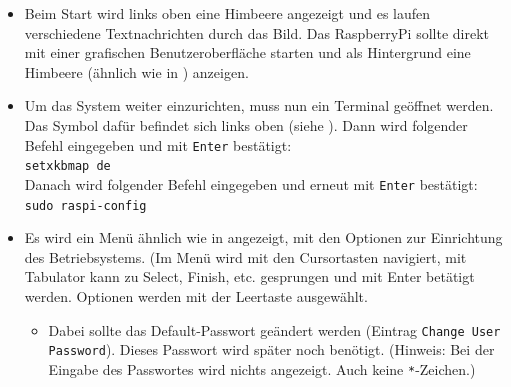 \begin{itemize}
{		Als letztes wird die Stromversorgung angeschlossen und das RaspberryPi startet automatisch.
		}
	\item {Beim Start wird links oben eine Himbeere angezeigt und es laufen verschiedene Textnachrichten durch das Bild. 
		Das RaspberryPi sollte direkt mit einer grafischen Benutzeroberfläche starten und als Hintergrund eine Himbeere (ähnlich wie in ) anzeigen.
		}
	\item {Um das System weiter einzurichten, muss nun ein Terminal geöffnet werden.
		Das Symbol dafür befindet sich links oben (siehe ).
		Dann wird folgender Befehl eingegeben und mit \lstinline|Enter| bestätigt:\\
		\lstinline|setxkbmap de|\\
		Danach wird folgender Befehl eingegeben und erneut mit \lstinline|Enter| bestätigt:\\
		\lstinline|sudo raspi-config|
		}
	\item {Es wird ein Menü ähnlich wie in  angezeigt, mit den Optionen zur Einrichtung des Betriebsystems. 
		(Im Menü wird mit den Cursortasten navigiert, mit Tabulator kann zu Select, Finish, etc. gesprungen und mit Enter betätigt werden. Optionen werden mit der Leertaste ausgewählt.
		\begin{itemize}
		\item {Dabei sollte das Default-Passwort geändert werden (Eintrag \lstinline|Change User Password|). Dieses Passwort wird später noch benötigt.
			(Hinweis: Bei der Eingabe des Passwortes wird nichts angezeigt. Auch keine \lstinline|*|-Zeichen.)}

\end{itemize}}
\end{itemize}
